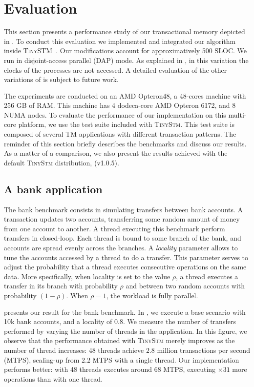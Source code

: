 \section{Evaluation}

This section presents a performance study of our \SPSER transactional memory depicted in .
To conduct this evaluation we implemented and integrated our algorithm inside \textsc{TinySTM}~\cite{FelberFMR10}.
Our modifications account for approximatively 500 SLOC.
We run  in disjoint-access parallel (DAP) mode.
As explained in , in this variation the clocks of the processes are not accessed.
A detailed evaluation of the other variations of  is subject to future work.

The experiments are conducted on an AMD Opteron48, a 48-cores machine with 256 GB of RAM. 
This machine has 4 dodeca-core AMD Opteron 6172, and 8 NUMA nodes.
To evaluate the performance of our implementation on this multi-core platform, we use the test suite included with \textsc{TinyStm}.
This test suite is composed of several TM applications with different transaction patterns.
The reminder of this section briefly describes the benchmarks and discuss our results.
As a matter of a comparison, we also present the results achieved with the default \textsc{TinyStm} distribution, (v1.0.5).
 
\subsection{A bank application}

The bank benchmark consists in simulating transfers between bank accounts.
A transaction updates two accounts, transferring some random amount of money from one account to another.
A thread executing this benchmark perform transfers in closed-loop.
Each thread is bound to some branch of the bank, and accounts are spread evenly across the branches.
A \emph{locality} parameter allows to tune the accounts accessed by a thread to do a transfer.
This parameter serves to adjust the probability that a thread executes consecutive operations on the same data.
More specifically, when locality is set to the value $\rho$, a thread executes a transfer in its branch with probability $\rho$ and between two random accounts with probability $(1-\rho)$.
When $\rho=1$, the workload is fully parallel.

 presents our result for the bank benchmark.
In , we execute a base scenario with 10k bank accounts, and a locality of 0.8.
We measure the number of transfers performed by varying the number of threads in the application.
In this figure, we observe that the performance obtained with \textsc{TinyStm} merely improves as the number of thread increases: 48 threads achieve $2.8$ million transactions per second (MTPS), scaling-up from $2.2$ MTPS with a single thread.
Our implementation performs better: with 48 threads  executes around 68 MTPS, executing $\times 31$ more operations than with one thread.

